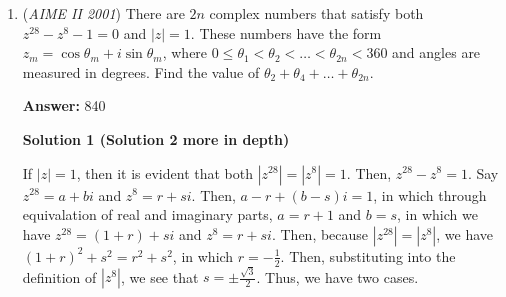 \begin{enumerate}
 



\textbf{Solution 3}

Since $\angle{BAD}=\angle{ADM}$, if we extend AB and DC, they must meet at one point to form a isosceles triangle $\triangle{ADM}$.Now, since the problem told that $\angle{ABD}=\angle{BCD}$, we can imply that $\angle{DBM}=\angle{BCM}$Since $\angle{M}=\angle{M}$, so $\triangle{CBM}\sim\triangle{BDM}$. Assume the length of $BM=x$;Since $\frac{BC}{MB}=\frac{DB}{MD}$ we can get $\frac{6}{x}=\frac{10}{8+x}$, we get that $x=12$.So $AM=DM=20$ similarly, we use the same pair of similar triangle we get $\frac{CM}{BM}=\frac{BM}{DM}$, we get that $CM=\frac{36}{5}$. Finally, $CD=MD-MC=\frac{64}{5}\implies 64+5=69=\boxed{069}$~bluesoul

 



\textbf{Solution 3}

Denote $\angle{BAD}=\angle{CDA}=x$, and $\angle{ABD}=\angle{BCD}=y$. Note that $\angle{ADB}=180^\circ-x-y$, and $\angle{DBC}=360^\circ-2x-2y$. This motivates us to draw the angle bisector of $\angle{DBC}$ because $\angle{DBC} = 2 \angle{ADB}$, so we do so and consider the intersection with $CD$ as $E$. By the angle bisector theorem, we have $\frac{CE}{DE} = \frac{BC}{BD} = \frac{3}{5}$, so we write $CE=3z$ and $DE=5z$. We also know that $\angle{EBC}=\angle{ADB}$ and $\angle{BCE}=\angle{DBA}$, so $\triangle{ADB} \sim \triangle{EBC}$. Hence, $\frac{CE}{BC}=\frac{AB}{BD}$, so we have $3z=\frac{24}{5}$. As $CD=8z$, it must be that $CD=\frac{64}{5}$, so the final answer is $\boxed{069}$.

 


	\item (\textit{AIME II 2001}) There are $2n$ complex numbers that satisfy both $z^{28} - z^{8} - 1 = 0$ and $|z| = 1$. These numbers have the form $z_{m} = \cos\theta_{m} + i\sin\theta_{m}$, where $0\leq\theta_{1} < \theta_{2} < \ldots < \theta_{2n} < 360$ and angles are measured in degrees. Find the value of $\theta_{2} + \theta_{4} + \ldots + \theta_{2n}$.


 
 \textbf{Answer: }840



\textbf{Solution 1 (Solution 2 more in depth)}

If $|z| = 1$, then it is evident that both $|z^{28}| = |z^8| = 1$. Then, $z^{28} - z^8 = 1$. Say $z^{28} = a+bi$ and $z^8 = r+si$. Then, $a-r + (b-s)i = 1$, in which through equivalation of real and imaginary parts, $a=r+1$ and $b=s$, in which we have $z^{28} = (1+r)+si$ and $z^8 = r+si$. Then, because $|z^{28}|=|z^8|$, we have $(1+r)^2+s^2 = r^2+s^2$, in which $r=-\frac{1}{2}$. Then, substituting into the definition of $|z^8|$, we see that $s=\pm \frac{\sqrt{3}}{2}$. Thus, we have two cases.


\end{enumerate}
